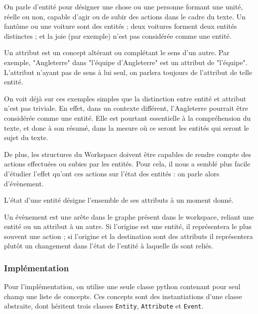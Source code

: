 \documentclass[a4paper, 12pt]{article}
\newcommand{\pyt}[1]{\texttt{#1}}%
\begin{document}
\begin{definition}[Entité]
On parle d'entité pour désigner une chose ou une personne formant une unité, réelle ou non, capable d'agir ou de subir des actions dans le cadre du texte. Un fantôme ou une voiture sont des entités ; deux voitures forment deux entités distinctes ; et la joie (par exemple) n'est pas considérée comme une entité.
\end{definition}
\begin{definition}[Attribut]
Un attribut est un concept altérant ou complétant le sens d'un autre. Par exemple, "Angleterre" dans "l'équipe d'Angleterre" est un attribut de "l'équipe". L'attribut n'ayant pas de sens à lui seul, on parlera toujours de l'attribut de telle entité.
\end{definition}

On voit déjà sur ces exemples simples que la distinction entre entité et attribut n'est pas triviale. En effet, dans un contexte différent, l'Angleterre pourrait être considérée comme une entité. Elle est pourtant essentielle à la compréhension du texte, et donc à son résumé, dans la mesure où ce seront les entités qui seront le sujet du texte.

De plus, les structures du Workspace doivent être capables de rendre compte des actions effectuées ou subies par les entités. Pour cela, il nous a semblé plus facile d'étudier l'effet qu'ont ces actions sur l'état des entités : on parle alors d'évènement.

\begin{definition}[État]
L'état d'une entité désigne l'ensemble de ses attributs à un moment donné.
\end{definition}
\begin{definition}[Évènement]
Un évènement est une arête dans le graphe présent dans le workspace, reliant une entité ou un attribut à un autre. Si l'origine est une entité, il représentera le plus souvent une action ; si l'origine et la destination sont des attributs il représentera plutôt un changement dans l'état de l'entité à laquelle ils sont reliés.
\end{definition}

\subsubsection{Implémentation}

Pour l'implémentation, on utilise une seule classe python contenant pour seul champ une liste de concepts. Ces concepts sont des instantiations d'une classe abstraite, dont héritent trois classes \pyt{Entity}, \pyt{Attribute} et \pyt{Event}.
\end{document}
